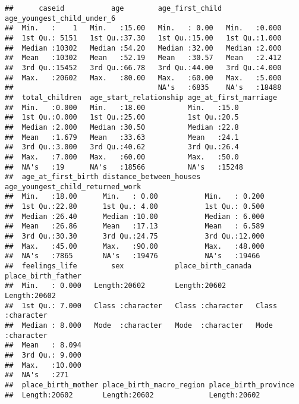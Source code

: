 \documentclass[
]{article}
\begin{document}
\begin{verbatim}
##      caseid           age        age_first_child age_youngest_child_under_6
##  Min.   :    1   Min.   :15.00   Min.   : 0.00   Min.   :0.000             
##  1st Qu.: 5151   1st Qu.:37.30   1st Qu.:15.00   1st Qu.:1.000             
##  Median :10302   Median :54.20   Median :32.00   Median :2.000             
##  Mean   :10302   Mean   :52.19   Mean   :30.57   Mean   :2.412             
##  3rd Qu.:15452   3rd Qu.:66.78   3rd Qu.:44.00   3rd Qu.:4.000             
##  Max.   :20602   Max.   :80.00   Max.   :60.00   Max.   :5.000             
##                                  NA's   :6835    NA's   :18488             
##  total_children  age_start_relationship age_at_first_marriage
##  Min.   :0.000   Min.   :18.00          Min.   :15.0         
##  1st Qu.:0.000   1st Qu.:25.00          1st Qu.:20.5         
##  Median :2.000   Median :30.50          Median :22.8         
##  Mean   :1.679   Mean   :33.63          Mean   :24.1         
##  3rd Qu.:3.000   3rd Qu.:40.62          3rd Qu.:26.4         
##  Max.   :7.000   Max.   :60.00          Max.   :50.0         
##  NA's   :19      NA's   :18566          NA's   :15248        
##  age_at_first_birth distance_between_houses age_youngest_child_returned_work
##  Min.   :18.00      Min.   : 0.00           Min.   : 0.200                  
##  1st Qu.:22.80      1st Qu.: 4.00           1st Qu.: 0.500                  
##  Median :26.40      Median :10.00           Median : 6.000                  
##  Mean   :26.86      Mean   :17.13           Mean   : 6.589                  
##  3rd Qu.:30.30      3rd Qu.:24.75           3rd Qu.:12.000                  
##  Max.   :45.00      Max.   :90.00           Max.   :48.000                  
##  NA's   :7865       NA's   :19476           NA's   :19466                   
##  feelings_life        sex            place_birth_canada place_birth_father
##  Min.   : 0.000   Length:20602       Length:20602       Length:20602      
##  1st Qu.: 7.000   Class :character   Class :character   Class :character  
##  Median : 8.000   Mode  :character   Mode  :character   Mode  :character  
##  Mean   : 8.094                                                           
##  3rd Qu.: 9.000                                                           
##  Max.   :10.000                                                           
##  NA's   :271                                                              
##  place_birth_mother place_birth_macro_region place_birth_province
##  Length:20602       Length:20602             Length:20602        

\end{verbatim}
\end{document}

